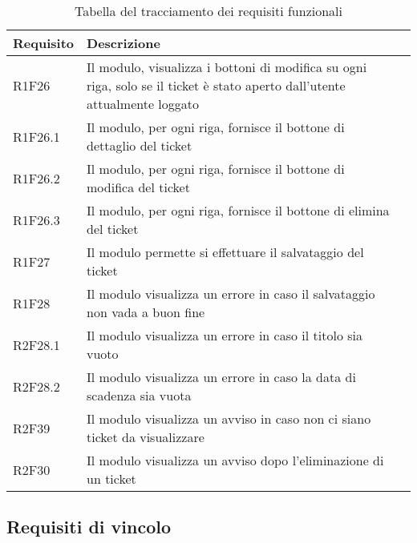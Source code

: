\pagebreak

\begin{table}[H]
{\renewcommand{\arraystretch}{2}
\begin{tabularx}{\textwidth}{PXl}
\hline\hline
\textbf{Requisito} & \textbf{Descrizione}\\
\hline

R1F26 & Il modulo, visualizza i bottoni di modifica su ogni riga, solo se il ticket è stato aperto dall'utente attualmente loggato \\
\hline
R1F26.1& Il modulo, per ogni riga, fornisce il bottone di dettaglio del ticket \\
\hline
R1F26.2 & Il modulo, per ogni riga, fornisce il bottone di modifica del ticket \\
\hline
R1F26.3 & Il modulo, per ogni riga, fornisce il bottone di elimina del ticket \\
\hline
R1F27 & Il modulo permette si effettuare il salvataggio del ticket\\
\hline
R1F28 & Il modulo visualizza un errore in caso il salvataggio non vada a buon fine \\
\hline
R2F28.1 & Il modulo visualizza un errore in caso il titolo sia vuoto\\
\hline
R2F28.2 & Il modulo visualizza un errore in caso la data di scadenza sia vuota\\
\hline
R2F39 & Il modulo visualizza un avviso in caso non ci siano ticket da visualizzare\\
\hline
R2F30 & Il modulo visualizza un avviso dopo l'eliminazione di un ticket\\
\hline

\end{tabularx}
}
\caption{Tabella del tracciamento dei requisiti funzionali}
\end{table}

\bigskip

\subsection{Requisiti di vincolo}

